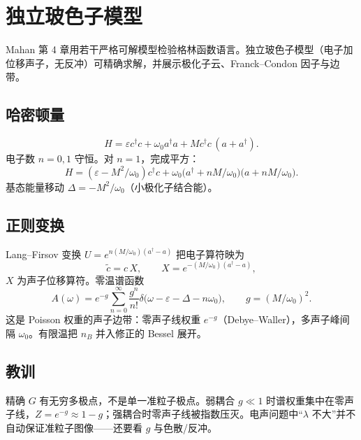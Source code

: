 \section{独立玻色子模型}

Mahan 第 4 章用若干严格可解模型检验格林函数语言。独立玻色子模型（电子加位移声子，无反冲）可精确求解，并展示极化子云、Franck--Condon 因子与边带。

\subsection{哈密顿量}

\begin{equation}
  H
  =\varepsilon c^\dagger c
  +\omega_0 a^\dagger a
  +M c^\dagger c\,(a+a^\dagger).
\end{equation}
电子数 $n=0,1$ 守恒。对 $n=1$，完成平方：
\begin{equation}
  H
  =(\varepsilon-M^2/\omega_0)c^\dagger c
  +\omega_0
  \bigl(a^\dagger +n M/\omega_0\bigr)
  \bigl(a+n M/\omega_0\bigr).
\end{equation}
基态能量移动 $\Delta=-M^2/\omega_0$（小极化子结合能）。

\subsection{正则变换}

Lang--Firsov 变换 $U=e^{n(M/\omega_0)(a^\dagger-a)}$ 把电子算符映为
\begin{equation}
  \tilde c
  =c\,X,
  \qquad
  X=e^{-(M/\omega_0)(a^\dagger-a)},
\end{equation}
$X$ 为声子位移算符。零温谱函数
\begin{equation}
  A(\omega)
  =e^{-g}
  \sum_{n=0}^{\infty}
  \frac{g^n}{n!}
  \delta\bigl(\omega-\varepsilon-\Delta-n\omega_0\bigr),
  \qquad
  g=(M/\omega_0)^2.
\label{eq:FC}
\end{equation}
这是 Poisson 权重的声子边带：零声子线权重 $e^{-g}$（Debye--Waller），多声子峰间隔 $\omega_0$。有限温把 $n_B$ 并入修正的 Bessel 展开。

\subsection{教训}

精确 $G$ 有无穷多极点，不是单一准粒子极点。弱耦合 $g\ll1$ 时谱权重集中在零声子线，$Z=e^{-g}\approx1-g$；强耦合时零声子线被指数压灭。电声问题中“$\lambda$ 不大”并不自动保证准粒子图像——还要看 $g$ 与色散/反冲。
